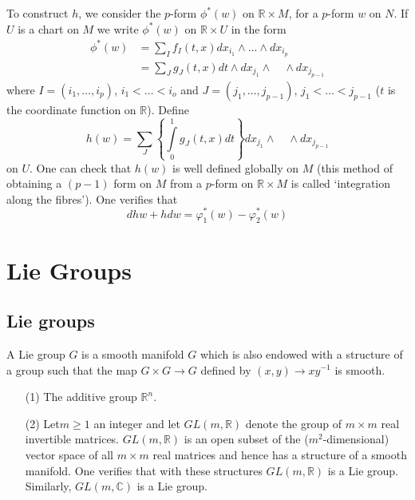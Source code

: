 To construct $h$, we consider the $p$-form $\phi^{*}(w)$ on $\mathbb{R}\times M$, for a $p$-form $w$ on $N$. If $U$ is a chart on $M$ we write $\phi^{*}(w)$ on $\mathbb{R}\times U$ in the form 
\begin{align*}
\phi^{*}(w) &= \sum\limits_{I}f_{I}(t,x)dx_{i_{1}}\wedge\ldots\wedge dx_{i_{p}}\\[3pt]
           &= \sum\limits_{J}g_{J}(t,x)dt\wedge dx_{j_{1}}\wedge\quad\wedge dx_{j_{p-1}}
\end{align*}
where $I=(i_{1},\ldots,i_{p})$, $i_{1}<\ldots<i_{o}$ and $J=(j_{1},\ldots,j_{p-1})$, $j_{1}<\ldots < j_{p-1}$ ($t$ is the coordinate function on $\mathbb{R}$). Define
$$
h(w)=\sum\limits_{J}\left\{\int\limits^{1}_{0}g_{J}(t,x)dt\right\}dx_{j_{1}}\wedge\quad\wedge dx_{j_{p-1}}
$$
on $U$. One can check that $h(w)$ is well defined globally on $M$ (this method of obtaining a $(p-1)$ form on $M$ from a $p$-form on $\mathbb{R}\times M$ is called `integration along the fibres'). One verifies that
$$
dhw+hdw=\varphi^{*}_{1}(w)-\varphi^{*}_{2}(w)
$$

\section{Lie Groups}\label{sec5}

\subsection*{Lie groups}

\begin{defi*}
A Lie group $G$ is a smooth manifold $G$ which is also endowed with a structure of a group such that the map $G\times G\to G$ defined by $(x,y)\to xy^{-1}$ is smooth.
\end{defi*}

\begin{examples*}
\begin{itemize}
\item[(1)] The additive group $\mathbb{R}^{n}$.

\item[(2)] Let\pageoriginale $m\geq 1$ an integer and let $GL(m,\mathbb{R})$ denote the group of $m\times m$ real invertible matrices. $GL(m,\mathbb{R})$ is an open subset of the ($m^{2}$-dimensional) vector space of all $m\times m$ real matrices and hence has a structure of a smooth manifold. One verifies that with these structures $GL(m,\mathbb{R})$ is a Lie group. Similarly, $GL(m,\mathbb{C})$ is a Lie group.
\end{itemize}
\end{examples*}


